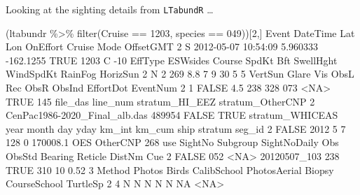 \documentclass[
]{book}
\newenvironment{Shaded}{\begin{snugshade}}{\end{snugshade}}
\newcommand{\ConstantTok}[1]{\textcolor[rgb]{0.00,0.00,0.00}{#1}}
\newcommand{\DecValTok}[1]{\textcolor[rgb]{0.00,0.00,0.81}{#1}}
\newcommand{\FloatTok}[1]{\textcolor[rgb]{0.00,0.00,0.81}{#1}}
\newcommand{\FunctionTok}[1]{\textcolor[rgb]{0.00,0.00,0.00}{#1}}
\newcommand{\NormalTok}[1]{#1}
\newcommand{\SpecialCharTok}[1]{\textcolor[rgb]{0.00,0.00,0.00}{#1}}
\newcommand{\StringTok}[1]{\textcolor[rgb]{0.31,0.60,0.02}{#1}}
\begin{document}
Looking at the sighting details from \texttt{LTabundR} \ldots{}

\begin{Shaded}
\begin{Highlighting}[]
\NormalTok{(ltabundr }\SpecialCharTok{\%\textgreater{}\%} \FunctionTok{filter}\NormalTok{(Cruise }\SpecialCharTok{==} \DecValTok{1203}\NormalTok{, species }\SpecialCharTok{==} \StringTok{\textquotesingle{}049\textquotesingle{}}\NormalTok{))[}\DecValTok{2}\NormalTok{,]}
\NormalTok{  Event            DateTime      Lat       Lon OnEffort Cruise Mode OffsetGMT}
\DecValTok{2}\NormalTok{     S }\DecValTok{2012{-}05{-}07} \DecValTok{10}\SpecialCharTok{:}\DecValTok{54}\SpecialCharTok{:}\DecValTok{09} \FloatTok{5.960333} \SpecialCharTok{{-}}\FloatTok{162.1255}     \ConstantTok{TRUE}   \DecValTok{1203}\NormalTok{    C       }\SpecialCharTok{{-}}\DecValTok{10}
\NormalTok{  EffType ESWsides Course SpdKt Bft SwellHght WindSpdKt RainFog HorizSun}
\DecValTok{2}\NormalTok{       N        }\DecValTok{2}    \DecValTok{269}   \FloatTok{8.8}   \DecValTok{7}         \DecValTok{9}        \DecValTok{30}       \DecValTok{5}        \DecValTok{5}
\NormalTok{  VertSun Glare Vis ObsL Rec ObsR ObsInd EffortDot EventNum}
\DecValTok{2}       \DecValTok{1} \ConstantTok{FALSE} \FloatTok{4.5}  \DecValTok{238} \DecValTok{328}  \DecValTok{073}   \SpecialCharTok{\textless{}}\ConstantTok{NA}\SpecialCharTok{\textgreater{}}      \ConstantTok{TRUE}      \DecValTok{145}
\NormalTok{                       file\_das line\_num stratum\_HI\_EEZ stratum\_OtherCNP}
\DecValTok{2}\NormalTok{ CenPac1986}\SpecialCharTok{{-}}\NormalTok{2020\_Final\_alb.das   }\DecValTok{489954}          \ConstantTok{FALSE}             \ConstantTok{TRUE}
\NormalTok{  stratum\_WHICEAS year month day yday km\_int   km\_cum ship  stratum seg\_id}
\DecValTok{2}           \ConstantTok{FALSE} \DecValTok{2012}     \DecValTok{5}   \DecValTok{7}  \DecValTok{128}      \DecValTok{0} \FloatTok{170008.1}\NormalTok{  OES OtherCNP    }\DecValTok{268}
\NormalTok{    use SightNo Subgroup SightNoDaily Obs ObsStd Bearing Reticle DistNm Cue}
\DecValTok{2} \ConstantTok{FALSE}     \DecValTok{052}     \SpecialCharTok{\textless{}}\ConstantTok{NA}\SpecialCharTok{\textgreater{}}\NormalTok{ 20120507\_103 }\DecValTok{238}   \ConstantTok{TRUE}     \DecValTok{310}      \DecValTok{10}   \FloatTok{0.52}   \DecValTok{3}
\NormalTok{  Method Photos Birds CalibSchool PhotosAerial Biopsy CourseSchool TurtleSp}
\DecValTok{2}      \DecValTok{4}\NormalTok{      N     N           N            N      N           }\ConstantTok{NA}     \SpecialCharTok{\textless{}}\ConstantTok{NA}\SpecialCharTok{\textgreater{}}

\end{Highlighting}
\end{Shaded}
\end{document}
